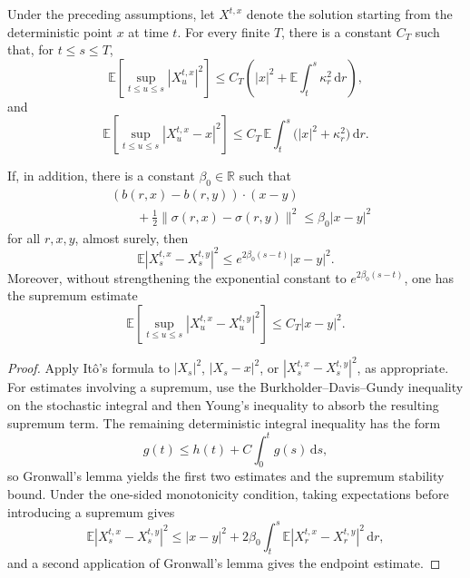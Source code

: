 \begin{thm}
Under the preceding assumptions, let \(X^{t,x}\) denote the solution starting from the deterministic point \(x\) at time \(t\). For every finite \(T\), there is a constant \(C_T\) such that, for \(t\le s\le T\),
\[
\mathbb E\!\left[
\sup_{t\le u\le s}|X_u^{t,x}|^2
\right]
\le
C_T\left(
|x|^2+
\mathbb E\int_t^s\kappa_r^2\,\mathrm dr
\right),
\]
and
\[
\mathbb E\!\left[
\sup_{t\le u\le s}|X_u^{t,x}-x|^2
\right]
\le
C_T\,
\mathbb E\int_t^s\bigl(|x|^2+\kappa_r^2\bigr)\,\mathrm dr.
\]

If, in addition, there is a constant \(\beta_0\in\mathbb R\) such that
\[
\begin{aligned}
&(b(r,x)-b(r,y))\cdot(x-y)\\
&\qquad
+\frac12\|\sigma(r,x)-\sigma(r,y)\|^2
\le\beta_0|x-y|^2
\end{aligned}
\]
for all \(r,x,y\), almost surely, then
\[
\mathbb E|X_s^{t,x}-X_s^{t,y}|^2
\le e^{2\beta_0(s-t)}|x-y|^2.
\]
Moreover, without strengthening the exponential constant to \(e^{2\beta_0(s-t)}\), one has the supremum estimate
\[
\mathbb E\!\left[
\sup_{t\le u\le s}|X_u^{t,x}-X_u^{t,y}|^2
\right]
\le C_T|x-y|^2.
\]
\end{thm}

\begin{proof}
Apply It\^o's formula to \(|X_s|^2\), \(|X_s-x|^2\), or \(|X_s^{t,x}-X_s^{t,y}|^2\), as appropriate. For estimates involving a supremum, use the Burkholder--Davis--Gundy inequality on the stochastic integral and then Young's inequality to absorb the resulting supremum term. The remaining deterministic integral inequality has the form
\[
g(t)\le h(t)+C\int_0^tg(s)\,\mathrm ds,
\]
so Gronwall's lemma yields the first two estimates and the supremum stability bound. Under the one-sided monotonicity condition, taking expectations before introducing a supremum gives
\[
\mathbb E|X_s^{t,x}-X_s^{t,y}|^2
\le |x-y|^2
+2\beta_0\int_t^s
\mathbb E|X_r^{t,x}-X_r^{t,y}|^2\,\mathrm dr,
\]
and a second application of Gronwall's lemma gives the endpoint estimate.
\end{proof}
